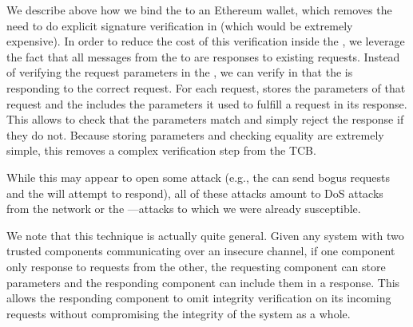 We describe above how we bind the \encname to an Ethereum wallet, which removes the need to do explicit signature verification in \tcont (which would be extremely expensive).
In order to reduce the cost of this verification inside the \encname, we leverage the fact that all messages from the \encname to \tcont are responses to existing requests.
Instead of verifying the request parameters in the \encname, we can verify in \tcont that the \encname is responding to the correct request.
For each request, \tcont stores the parameters of that request and the \encname includes the parameters it used to fulfill a request in its response.
This allows \tcont to check that the parameters match and simply reject the response if they do not.
Because storing parameters and checking equality are extremely simple, this removes a complex verification step from the TCB.

While this may appear to open some attack (e.g., the \medname can send bogus requests and the \encname will attempt to respond),
all of these attacks amount to DoS attacks from the network or the \medname---attacks to which we were already susceptible.

We note that this technique is actually quite general.
Given any system with two trusted components communicating over an insecure channel, if one component only response to requests from the other,
the requesting component can store parameters and the responding component can include them in a response.
This allows the responding component to omit integrity verification on its incoming requests without compromising the integrity of the system as a whole.





